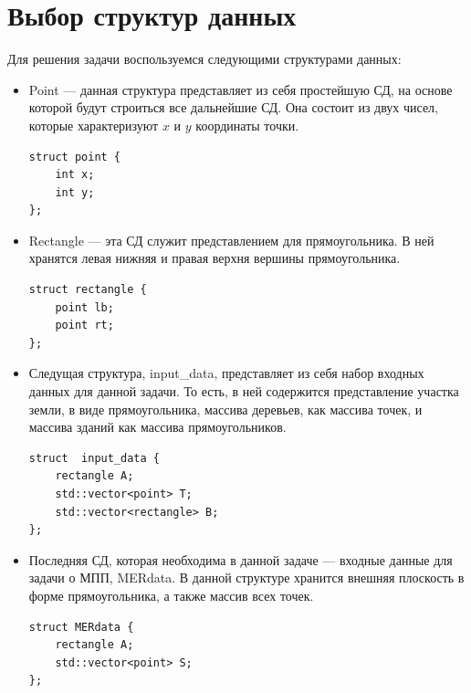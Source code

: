 \documentclass[a4paper,12pt]{article}
\begin{document}
\newpage

\section{Выбор структур данных} {
Для решения задачи воспользуемся следующими структурами данных:
\begin{itemize}
\item Point — данная структура представляет из себя простейшую СД, на основе которой будут строиться все дальнейшие СД. Она состоит из двух чисел, которые характеризуют $x$ и $y$ координаты точки. \\
\begin{lstlisting}
struct point {
	int x;
	int y;
};

\end{lstlisting}
\item Rectangle — эта СД служит представлением для прямоугольника. В ней хранятся левая нижняя и правая верхня вершины прямоугольника. \\
\begin{lstlisting}
struct rectangle {
	point lb;
	point rt;
};
\end{lstlisting}
\item Следущая структура, input\_data, представляет из себя набор входных данных для данной задачи. То есть, в ней содержится представление участка земли, в виде прямоугольника, массива деревьев, как массива точек, и массива зданий как массива прямоугольников.\\
\begin{lstlisting}
struct  input_data {
	rectangle A;
	std::vector<point> T;
	std::vector<rectangle> B;
};
\end{lstlisting}
\item Последняя СД, которая необходима в данной задаче — входные данные для задачи о МПП, MERdata. В данной структуре хранится внешняя плоскость в форме прямоугольника, а также массив всех точек.
\begin{lstlisting}
struct MERdata {
	rectangle A;
	std::vector<point> S;
};
\end{lstlisting}
\end{itemize}
}

\newpage
\end{document}
